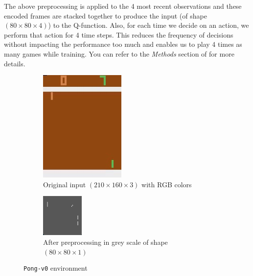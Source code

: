 \documentclass{article}
\begin{document}
The above preprocessing is applied to the 4 most recent observations and these encoded frames are stacked together to produce the input (of shape $(80 \times 80 \times 4)$) to the Q-function. Also, for each time we decide on an action, we perform that action for 4 time steps. This reduces the frequency of decisions without impacting the performance too much and enables us to play 4 times as many games while training. You can refer to the \textit{Methods} section of \cite{mnih2015human} for more details.       \\

\begin{figure}[H]
\centering
\begin{subfigure}[b]{.5\textwidth}
  \centering
  \includegraphics[width=.25\linewidth]{pong}
  \caption{Original input $ (210 \times 160 \times 3) $ with RGB colors}
  \label{fig:pong}
\end{subfigure}
\begin{subfigure}[b]{.5\textwidth}
  \centering
  \includegraphics[width=.15\linewidth]{pong_grey}
  \caption{After preprocessing in grey scale of shape $ (80 \times 80 \times 1 ) $}
  \label{fig:pong_grey}
\end{subfigure}
\caption{\texttt{Pong-v0} environment}
\label{fig:pong_env}
\end{figure}
\end{document}
